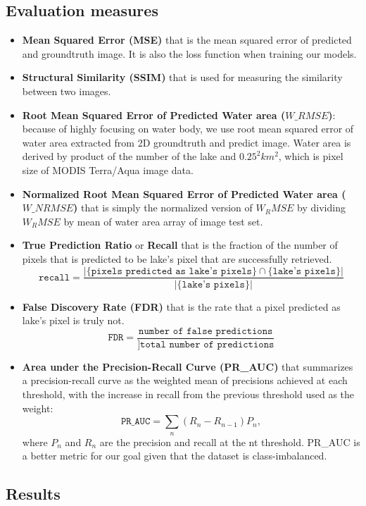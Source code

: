 \subsection{Evaluation measures}
\begin{itemize}
    \item \textbf{Mean Squared Error (MSE)} that is the mean squared error of predicted and groundtruth image. It is also the loss function when training our models.
    \item \textbf{Structural Similarity (SSIM)} that is used for measuring the similarity between two images. %
    \item \textbf{Root Mean Squared Error of Predicted Water area ($W\_RMSE$)}: because of highly focusing on water body, we use root mean squared error of water area extracted from 2D groundtruth and predict image. Water area is derived by product of the number of the lake and $0.25^2 km^2$, which is pixel size of MODIS Terra/Aqua image data.
    \item \textbf{Normalized Root Mean Squared Error of Predicted Water area ($W\_NRMSE$)} that is simply the normalized version of $W_RMSE$ by dividing $W_RMSE$ by mean of water area array of image test set.
    \item \textbf{True Prediction Ratio} or \textbf{Recall} that is the fraction of the number of pixels that is predicted to be lake's pixel that are successfully retrieved.
    \[ \texttt{recall} = \frac{|\{\texttt{pixels predicted as lake's pixels}\} \cap \{\texttt{lake's pixels}\}|}{|\{\texttt{lake's pixels}\}|} \]
    \item \textbf{False Discovery Rate (FDR)} that is the rate that a pixel predicted as lake's pixel is truly not.
    \[ \texttt{FDR} = \frac{\texttt{number of false predictions}}{]\texttt{total number of predictions}} \]
    \item \textbf{Area under the Precision-Recall Curve (PR\_AUC)} that summarizes a precision-recall curve as the weighted mean of precisions achieved at each threshold, with the increase in recall from the previous threshold used as the weight:
    \[ \texttt{PR\_AUC} = \sum_n{(R_n - R_{n-1})}{P_n}, \] %
    where $P_n$ and $R_n$ are the precision and recall at the nt threshold. PR\_AUC is a better metric for our goal given that the dataset is class-imbalanced. %
\end{itemize}

\subsection{Results}

